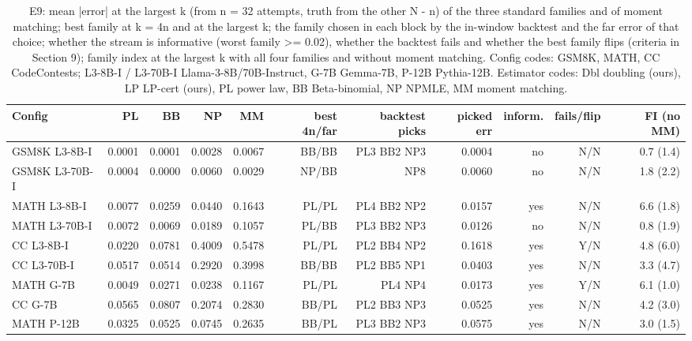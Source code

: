 \begin{table}[t]
\centering
\small
\begin{tabular}{lrrrrrrrrrr}
\toprule
Config & PL & BB & NP & MM & best 4n/far & backtest picks & picked err & inform. & fails/flip & FI (no MM) \\
\midrule
GSM8K L3-8B-I & 0.0001 & 0.0001 & 0.0028 & 0.0067 & BB/BB & PL3 BB2 NP3 & 0.0004 & no & N/N & 0.7 (1.4) \\
GSM8K L3-70B-I & 0.0004 & 0.0000 & 0.0060 & 0.0029 & NP/BB & NP8 & 0.0060 & no & N/N & 1.8 (2.2) \\
MATH L3-8B-I & 0.0077 & 0.0259 & 0.0440 & 0.1643 & PL/PL & PL4 BB2 NP2 & 0.0157 & yes & N/N & 6.6 (1.8) \\
MATH L3-70B-I & 0.0072 & 0.0069 & 0.0189 & 0.1057 & PL/BB & PL3 BB2 NP3 & 0.0126 & no & N/N & 0.8 (1.9) \\
CC L3-8B-I & 0.0220 & 0.0781 & 0.4009 & 0.5478 & PL/PL & PL2 BB4 NP2 & 0.1618 & yes & Y/N & 4.8 (6.0) \\
CC L3-70B-I & 0.0517 & 0.0514 & 0.2920 & 0.3998 & BB/BB & PL2 BB5 NP1 & 0.0403 & yes & N/N & 3.3 (4.7) \\
MATH G-7B & 0.0049 & 0.0271 & 0.0238 & 0.1167 & PL/PL & PL4 NP4 & 0.0173 & yes & Y/N & 6.1 (1.0) \\
CC G-7B & 0.0565 & 0.0807 & 0.2074 & 0.2830 & BB/PL & PL2 BB3 NP3 & 0.0525 & yes & N/N & 4.2 (3.0) \\
MATH P-12B & 0.0325 & 0.0525 & 0.0745 & 0.2635 & BB/PL & PL3 BB2 NP3 & 0.0575 & yes & N/N & 3.0 (1.5) \\
\bottomrule
\end{tabular}
\caption{E9: mean |error| at the largest k (from n = 32 attempts, truth from the other N - n) of the three standard families and of moment matching; best family at k = 4n and at the largest k; the family chosen in each block by the in-window backtest and the far error of that choice; whether the stream is informative (worst family >= 0.02), whether the backtest fails and whether the best family flips (criteria in Section 9); family index at the largest k with all four families and without moment matching. Config codes: GSM8K, MATH, CC CodeContests; L3-8B-I / L3-70B-I Llama-3-8B/70B-Instruct, G-7B Gemma-7B, P-12B Pythia-12B. Estimator codes: Dbl doubling (ours), LP LP-cert (ours), PL power law, BB Beta-binomial, NP NPMLE, MM moment matching.}
\label{tab:T14b_monkey_business_family_choice}
\end{table}
